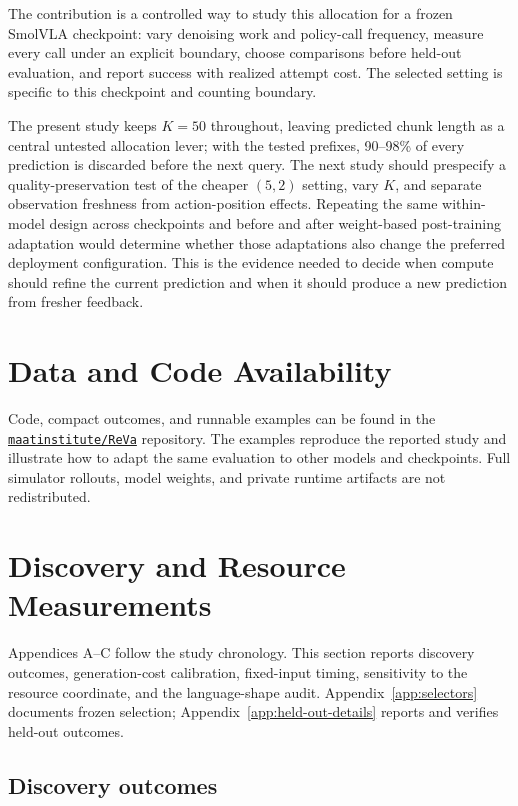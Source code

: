 \documentclass{article}
\begin{document}
The contribution is a controlled way to study this allocation for a frozen
SmolVLA checkpoint: vary denoising work and policy-call frequency, measure every
call under an explicit boundary, choose comparisons before held-out evaluation,
and report success with realized attempt cost. The selected setting is specific
to this checkpoint and counting boundary.

The present study keeps $K=50$ throughout, leaving predicted chunk length as a
central untested allocation lever; with the tested prefixes, 90--98\% of every
prediction is discarded before the next query. The next study should
prespecify a quality-preservation test of the cheaper $(5,2)$ setting, vary $K$,
and separate observation freshness from action-position effects. Repeating the
same within-model design across checkpoints and before and after weight-based
post-training adaptation would determine whether those adaptations also change
the preferred deployment configuration. This is the evidence needed to decide
when compute should refine the current prediction and when it should produce a
new prediction from fresher feedback.

\section*{Data and Code Availability}
Code, compact outcomes, and runnable examples can be found in the
\href{https://github.com/maatinstitute/ReVa}{\texttt{maatinstitute/ReVa}}
repository. The examples reproduce the reported study and illustrate how to
adapt the same evaluation to other models and checkpoints. Full simulator
rollouts, model weights, and private runtime artifacts are not redistributed.


{\raggedright}
\clearpage
\appendix

\section{Discovery and Resource Measurements}
\label{app:calibration}

Appendices A--C follow the study chronology. This section reports discovery
outcomes, generation-cost calibration, fixed-input timing, sensitivity to the
resource coordinate, and the language-shape audit. Appendix~\ref{app:selectors}
documents frozen selection; Appendix~\ref{app:held-out-details} reports and
verifies held-out outcomes.

\subsection{Discovery outcomes}
\label{app:discovery-outcomes}
\end{document}
